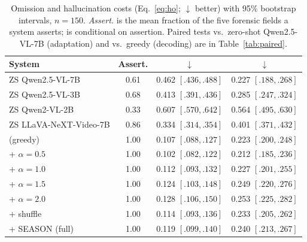 \begin{table}[!t]
\centering
\caption{Omission and hallucination costs (Eq.~\eqref{eq:ho}; $\downarrow$ better) with 95\% bootstrap intervals, $n{=}150$. \emph{Assert.} is the mean fraction of the five forensic fields a system asserts; \Hcost{} is conditional on assertion. Paired tests vs.\ zero-shot Qwen2.5-VL-7B (adaptation) and vs.\ greedy (decoding) are in Table~\ref{tab:paired}.}
\label{tab:ho}
\small
\setlength{\tabcolsep}{8pt}
\begin{tabular*}{\textwidth}{@{\extracolsep{\fill}}lccc@{}}
\toprule
\textbf{System} & \textbf{Assert.} & \textbf{\Ocost{}}$\downarrow$ & \textbf{\Hcost{}}$\downarrow$ \\
\midrule
ZS Qwen2.5-VL-7B        & 0.61 & 0.462 $[.436,.488]$ & 0.227 $[.188,.268]$ \\
ZS Qwen2.5-VL-3B        & 0.68 & 0.413 $[.391,.436]$ & 0.285 $[.247,.324]$ \\
ZS Qwen2-VL-2B          & 0.33 & 0.607 $[.570,.642]$ & 0.564 $[.495,.630]$ \\
ZS LLaVA-NeXT-Video-7B  & 0.86 & 0.334 $[.314,.354]$ & 0.401 $[.371,.432]$ \\
\midrule
\crashlogic{} (greedy)                  & 1.00 & 0.107 $[.088,.127]$ & 0.223 $[.200,.248]$ \\
\crashlogic{} + \tcd{} $\alpha{=}0.5$   & 1.00 & 0.102 $[.082,.122]$ & 0.212 $[.185,.236]$ \\
\crashlogic{} + \tcd{} $\alpha{=}1.0$   & 1.00 & 0.112 $[.093,.132]$ & 0.227 $[.201,.255]$ \\
\crashlogic{} + \tcd{} $\alpha{=}1.5$   & 1.00 & 0.124 $[.103,.148]$ & 0.249 $[.220,.276]$ \\
\crashlogic{} + \tcd{} $\alpha{=}2.0$   & 1.00 & 0.128 $[.106,.150]$ & 0.253 $[.225,.282]$ \\
\crashlogic{} + \tcd{} shuffle          & 1.00 & 0.114 $[.093,.136]$ & 0.233 $[.205,.262]$ \\
\crashlogic{} + SEASON (full)           & 1.00 & 0.119 $[.099,.140]$ & 0.240 $[.213,.267]$ \\
\bottomrule
\end{tabular*}
\end{table}
